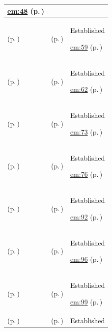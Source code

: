 \begin{longtable}{|>{\raggedright\arraybackslash}p{0.27\TableWidth}|>{\raggedright\arraybackslash}p{0.27\TableWidth}|>{\raggedright\arraybackslash}p{0.46\TableWidth}|}
 \hyperref[rad:em:41]{em:48} (p.\,\pageref{rad:em:41})\\\hline
\nameref{function:maintain-client-relationships} (p.\,\pageref{function:maintain-client-relationships}) & \nameref{feature:feat-em-07} (p.\,\pageref{feature:feat-em-07}) & Established

 \hyperref[rad:em:55]{em:59} (p.\,\pageref{rad:em:55})\\\hline
\nameref{function:govern-client-relationship-validity} (p.\,\pageref{function:govern-client-relationship-validity}) & \nameref{feature:feat-em-08} (p.\,\pageref{feature:feat-em-08}) & Established

 \hyperref[rad:em:55]{em:62} (p.\,\pageref{rad:em:55})\\\hline
\nameref{function:evaluate-client-consent} (p.\,\pageref{function:evaluate-client-consent}) & \nameref{feature:feat-em-09} (p.\,\pageref{feature:feat-em-09}) & Established

 \hyperref[rad:em:69]{em:73} (p.\,\pageref{rad:em:69})\\\hline
\nameref{function:evaluate-client-confidentiality-restrictions} (p.\,\pageref{function:evaluate-client-confidentiality-restrictions}) & \nameref{feature:feat-em-10} (p.\,\pageref{feature:feat-em-10}) & Established

 \hyperref[rad:em:69]{em:76} (p.\,\pageref{rad:em:69})\\\hline
\nameref{function:verify-practitioner-registration} (p.\,\pageref{function:verify-practitioner-registration}) & \nameref{feature:feat-em-11} (p.\,\pageref{feature:feat-em-11}) & Established

 \hyperref[rad:em:86]{em:92} (p.\,\pageref{rad:em:86})\\\hline
\nameref{function:govern-practitioner-profile} (p.\,\pageref{function:govern-practitioner-profile}) & \nameref{feature:feat-em-12} (p.\,\pageref{feature:feat-em-12}) & Established

 \hyperref[rad:em:86]{em:96} (p.\,\pageref{rad:em:86})\\\hline
\nameref{function:maintain-practitioner-roles} (p.\,\pageref{function:maintain-practitioner-roles}) & \nameref{feature:feat-em-13} (p.\,\pageref{feature:feat-em-13}) & Established

 \hyperref[rad:em:86]{em:99} (p.\,\pageref{rad:em:86})\\\hline
\nameref{function:bind-practitioner-electronic-endpoints} (p.\,\pageref{function:bind-practitioner-electronic-endpoints}) & \nameref{feature:feat-em-14} (p.\,\pageref{feature:feat-em-14}) & Established


\end{longtable}
